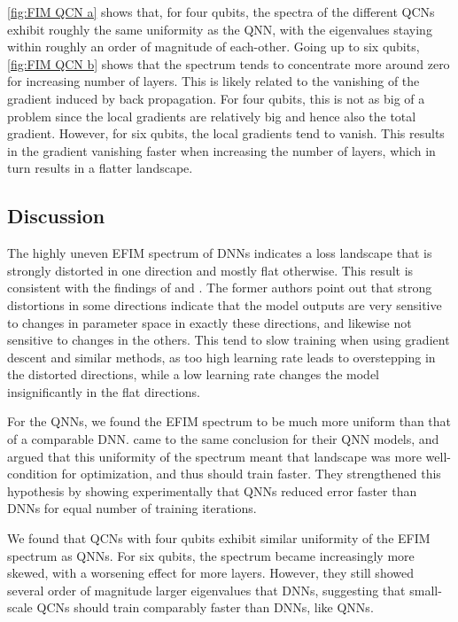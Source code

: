 \autoref{fig:FIM QCN a} shows that, for four qubits, the spectra of the different QCNs exhibit roughly the same uniformity as the QNN, with the eigenvalues staying within roughly an order of magnitude of each-other. Going up to six qubits, \autoref{fig:FIM QCN b} shows that the spectrum tends to concentrate more around zero for increasing number of layers. This is likely related to the vanishing of the gradient induced by back propagation. For four qubits, this is not as big of a problem since the local gradients are relatively big and hence also the total gradient. However, for six qubits, the local gradients tend to vanish. This results in the gradient vanishing faster when increasing the number of layers, which in turn results in a flatter landscape. 


\subsection{Discussion}\label{sec:Loss Landscape Discussion}
The highly uneven EFIM spectrum of DNNs indicates a loss landscape that is strongly distorted in one direction and mostly flat otherwise. This result is consistent with the findings of \citet{karakida2019universal} and \citet{abbas2020power}. The former authors point out that strong distortions in some directions indicate that the model outputs are very sensitive to changes in parameter space in exactly these directions, and likewise not sensitive to changes in the others. This tend to slow training when using gradient descent and similar methods, as too high learning rate leads to overstepping in the distorted directions, while a low learning rate changes the model insignificantly in the flat directions. 

For the QNNs, we found the EFIM spectrum to be much more uniform than that of a comparable DNN. \citet{abbas2020power} came to the same conclusion for their QNN models, and argued that this uniformity of the spectrum meant that landscape was more well-condition for optimization, and thus should train faster. They strengthened this hypothesis by showing experimentally that QNNs reduced error faster than DNNs for equal number of training iterations. 

We found that QCNs with four qubits exhibit similar uniformity of the EFIM spectrum as QNNs. For six qubits, the spectrum became increasingly more skewed, with a worsening effect for more layers. However, they still showed several order of magnitude larger eigenvalues that DNNs, suggesting that small-scale QCNs should train comparably faster than DNNs, like QNNs.

